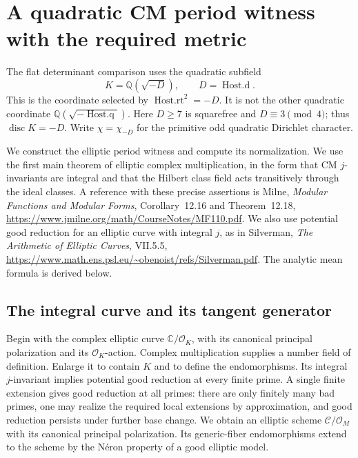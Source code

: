 \section{A quadratic CM period witness with the required metric}
\label{sec:sr-quadratic-period-witness}

The flat determinant comparison uses the quadratic subfield
\[
                  K=\mathbb Q(\sqrt{-D}),
                  \qquad D=\operatorname{Host.d}.
\]
This is the coordinate selected by
\(\operatorname{Host.rt}^2=-D\).
It is not the other quadratic coordinate
\(\mathbb Q(\sqrt{-\operatorname{Host.q}})\).
Here \(D\ge7\) is squarefree and \(D\equiv3\pmod4\);
thus \(\operatorname{disc}K=-D\).
Write \(\chi=\chi_{-D}\) for the primitive odd quadratic
Dirichlet character.

We construct the elliptic period witness and compute its
normalization.  We use the first main theorem of elliptic
complex multiplication, in the form that CM \(j\)-invariants
are integral and that the Hilbert class field acts
transitively through the ideal classes.
A reference with these precise assertions is Milne,
\emph{Modular Functions and Modular Forms},
Corollary~12.16 and Theorem~12.18,
\url{https://www.jmilne.org/math/CourseNotes/MF110.pdf}.
We also use potential good reduction for an elliptic curve
with integral \(j\), as in Silverman,
\emph{The Arithmetic of Elliptic Curves}, VII.5.5,
\url{https://www.math.ens.psl.eu/~obenoist/refs/Silverman.pdf}.
The analytic mean formula is derived below.

\subsection{The integral curve and its tangent generator}

Begin with the complex elliptic curve
\(\mathbb C/\mathcal O_K\), with its canonical principal
polarization and its \(\mathcal O_K\)-action.
Complex multiplication supplies a number field of definition.
Enlarge it to contain \(K\) and to define the endomorphisms.
Its integral \(j\)-invariant implies potential good reduction
at every finite prime.  A single finite extension gives good
reduction at all primes: there are only finitely many bad
primes, one may realize the required local extensions by
approximation, and good reduction persists under further
base change.
We obtain an elliptic scheme \(\mathcal C/\mathcal O_M\)
with its canonical principal polarization.
Its generic-fiber endomorphisms extend to the scheme by the
N\'eron property of a good elliptic model.

